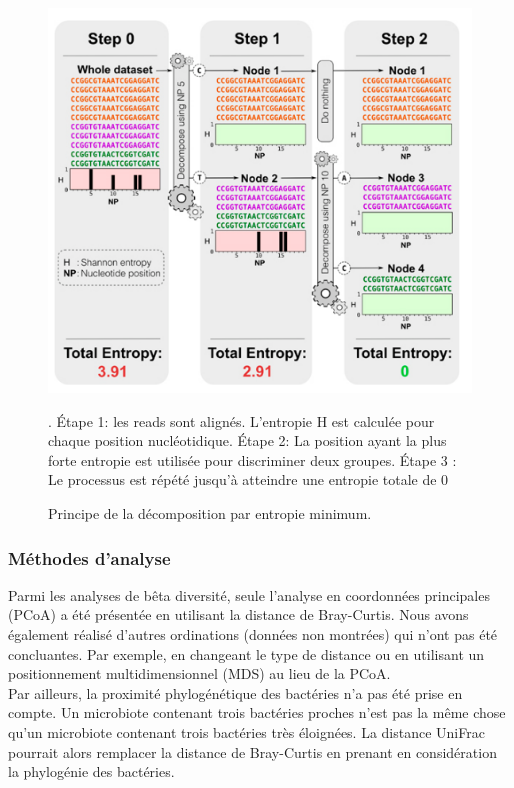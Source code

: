 \documentclass[12pt,a4paper]{article}
\begin{document}
{\begin{figure}
\begin{center}
\includegraphics[scale=0.65]{img/entropy.png}\hfill
\end{center}
\caption{Principe de la décomposition par entropie minimum.}\cite{Bobadilla2015}. Étape 1: les reads sont alignés. L'entropie H est calculée pour chaque position nucléotidique. Étape 2: La position ayant la plus forte entropie est utilisée pour discriminer deux groupes. Étape 3 : Le processus est répété jusqu'à atteindre une entropie totale de 0 
\label{entropy}
\end{figure}
\subsubsection{Méthodes d'analyse}
Parmi les analyses de bêta diversité, seule l'analyse en coordonnées principales (PCoA) a été présentée en utilisant la distance de Bray-Curtis.
Nous avons également réalisé d'autres ordinations (données non montrées) qui n'ont pas été concluantes. Par exemple, en changeant le type de distance ou en utilisant un positionnement multidimensionnel (MDS) au lieu de la PCoA. \\
Par ailleurs, la proximité phylogénétique des bactéries n'a pas été prise en compte. Un microbiote contenant trois bactéries proches n'est pas la même chose qu'un microbiote contenant trois bactéries très éloignées.
La distance UniFrac\cite{Lozupone2005} pourrait alors remplacer la distance de Bray-Curtis en prenant en considération la phylogénie des bactéries.


}
\end{document}
